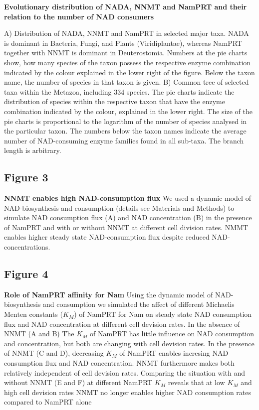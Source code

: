 \textbf{Evolutionary distribution of NADA, NNMT and NamPRT and their relation to the number of NAD consumers} {A) Distribution of NADA, NNMT and NamPRT in selected major taxa. NADA is dominant in Bacteria, Fungi, and Plants (Viridiplantae), whereas NamPRT together with NNMT is dominant in Deuterostomia. Numbers at the pie charts show, how many species of the taxon possess the respective enzyme combination indicated by the colour explained in the lower right of the figure. Below the taxon name, the number of species in that taxon is given. B) Common tree of selected taxa within the Metazoa, including 334 species. The pie charts indicate the distribution of species within the respective taxon that have the enzyme combination indicated by the colour, explained in the lower right. The size of the pie charts is proportional to the logarithm of the number of species analysed in the particular taxon. The numbers below the taxon names indicate the average number of NAD-consuming enzyme families found in all sub-taxa. The branch length is arbitrary.


\subsection{Figure 3}

\textbf{NNMT enables high NAD-consumption flux} We used a dynamic model of NAD-biosynthesis and consumption (details see Materials and Methods)  to simulate NAD consumption flux (A) and NAD concentration (B) in the presence of NamPRT and with or without NNMT at different cell division rates.  NMMT enables higher steady state NAD-consumption flux despite reduced NAD-concentrations.


\subsection{Figure 4}
\textbf{Role of NamPRT affinity for Nam} Using the dynamic model of NAD-biosynthesis and consumption we simulated the affect of different Michaelis Menten constants ($K_M$)  of NamPRT for Nam on steady state NAD consumption flux and NAD concentration at different cell devision rates. In the absence of NNMT (A and B) The $K_M$ of NamPRT has little influence on NAD consumption and concentration, but both are changing with cell devision rates. In the presence of NNMT (C and D), decreasing $K_M$ of NamPRT enables incresing NAD consumption flux and NAD concentration. NNMT furthermore makes both relatively independent of cell devision rates. Comparing the situation with and without NNMT (E and F) at different NamPRT $K_M$ reveals that at low $K_M$ and high cell devision rates NNMT no longer enables higher NAD consumption rates compared to NamPRT alone



}

